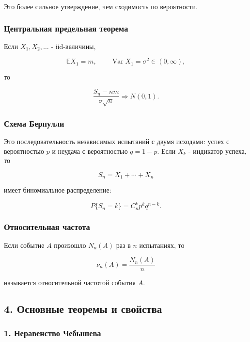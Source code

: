 \documentclass[
  11pt,
  a4paper,
]{article}
\begin{document}
Это более сильное утверждение, чем сходимость по вероятности.

\subsubsection{Центральная предельная
теорема}\label{ux446ux435ux43dux442ux440ux430ux43bux44cux43dux430ux44f-ux43fux440ux435ux434ux435ux43bux44cux43dux430ux44f-ux442ux435ux43eux440ux435ux43cux430-1}

Если \(X_1,X_2,\ldots\) - iid-величины,

\[
\mathbb EX_1=m,
\qquad
\operatorname{Var}X_1=\sigma^2\in(0,\infty),
\]

то

\[
\frac{S_n-nm}{\sigma\sqrt n}
\Rightarrow
N(0,1).
\]

\subsubsection{Схема
Бернулли}\label{ux441ux445ux435ux43cux430-ux431ux435ux440ux43dux443ux43bux43bux438}

Это последовательность независимых испытаний с двумя исходами: успех с
вероятностью \(p\) и неудача с вероятностью \(q=1-p\). Если \(X_k\) -
индикатор успеха, то

\[
S_n=X_1+\cdots+X_n
\]

имеет биномиальное распределение:

\[
P\{S_n=k\}=C_n^k p^kq^{n-k}.
\]

\subsubsection{Относительная
частота}\label{ux43eux442ux43dux43eux441ux438ux442ux435ux43bux44cux43dux430ux44f-ux447ux430ux441ux442ux43eux442ux430}

Если событие \(A\) произошло \(N_n(A)\) раз в \(n\) испытаниях, то

\[
\nu_n(A)=\frac{N_n(A)}{n}
\]

называется относительной частотой события \(A\).

\subsection{4. Основные теоремы и
свойства}\label{ux43eux441ux43dux43eux432ux43dux44bux435-ux442ux435ux43eux440ux435ux43cux44b-ux438-ux441ux432ux43eux439ux441ux442ux432ux430}

\subsubsection{1. Неравенство
Чебышева}\label{ux43dux435ux440ux430ux432ux435ux43dux441ux442ux432ux43e-ux447ux435ux431ux44bux448ux435ux432ux430}
\end{document}
